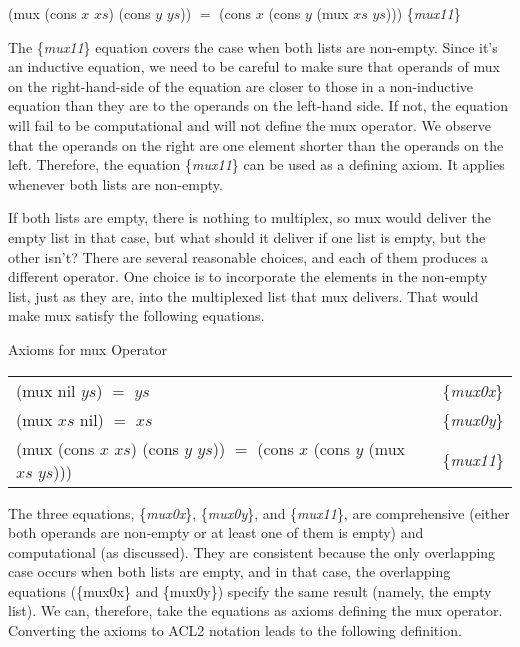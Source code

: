 \hspace{1cm} \textsf{(mux (cons $x$ $xs$) (cons $y$ $ys$)) $=$ (cons $x$ (cons $y$ (mux $xs$ $ys$)))}
\hfill \{\emph{mux11}\}

The \{\emph{mux11}\} equation covers the case when both lists are non-empty.
Since it's an inductive equation, we need to be careful to make sure
that operands of \textsf{mux} on the right-hand-side of the equation
are closer to those in a non-inductive equation than they are
to the operands on the left-hand side.
If not, the equation will fail to be computational and
will not define the \textsf{mux} operator.
We observe that the operands on the right
are one element shorter than the operands on the left.
Therefore, the equation \{\emph{mux11}\} can be used
as a defining axiom. It applies whenever both lists are non-empty.

If both lists are empty, there is nothing to multiplex,
so \textsf{mux} would deliver the empty list in that case, but
what should it deliver if one list is empty, but the other isn't?
There are several reasonable choices, and each of them produces
a different operator. One choice is to incorporate the elements
in the non-empty list, just as they are, into the
multiplexed list that \textsf{mux}  delivers.
That would make \textsf{mux} satisfy the following equations.

\begin{center}
Axioms for \textsf{mux} Operator\label{axioms:mux}
\begin{tabular}{ll}
\textsf{(mux nil $ys$) $=$ $ys$}  & \{\emph{mux0x}\}     \\
\textsf{(mux $xs$ nil) $=$ $xs$}  & \{\emph{mux0y}\}     \\
\textsf{(mux (cons $x$ $xs$) (cons $y$ $ys$)) $=$ (cons $x$ (cons $y$ (mux $xs$ $ys$)))} & \{\emph{mux11}\} \\
\end{tabular}
\end{center}

\label{def:mux}The three equations, \{\emph{mux0x}\}, \{\emph{mux0y}\}, and \{\emph{mux11}\},
are comprehensive (either both operands are non-empty
or at least one of them is empty) and computational (as discussed).
They are consistent because the only overlapping case
occurs when both lists are empty, and in that case,
the overlapping equations
(\{mux0x\} and \{mux0y\}) specify the same result
(namely, the empty list).
We can, therefore, take the equations as axioms
defining the \textsf{mux} operator.
Converting the axioms to ACL2 notation leads to the following
definition.

